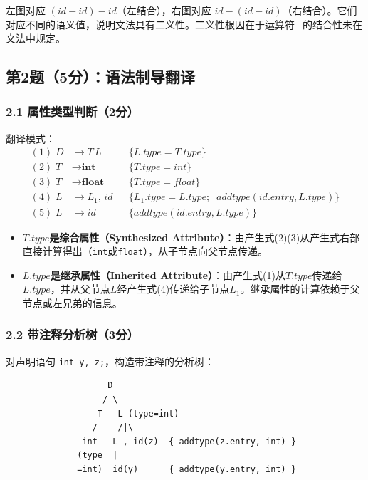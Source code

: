 \documentclass[12pt,a4paper,fontset=fandol]{ctexart}
\begin{document}
左图对应 $(id - id) - id$（左结合），右图对应 $id - (id - id)$（右结合）。它们对应不同的语义值，说明文法具有二义性。二义性根因在于运算符$-$的结合性未在文法中规定。

\subsection{第2题（5分）：语法制导翻译}

\subsubsection*{2.1 属性类型判断（2分）}

翻译模式：
\begin{align*}
(1)\; D &\to T\,L && \{ L.\textit{type} = T.\textit{type} \} \\
(2)\; T &\to \textbf{int} && \{ T.\textit{type} = \textit{int} \} \\
(3)\; T &\to \textbf{float} && \{ T.\textit{type} = \textit{float} \} \\
(4)\; L &\to L_1,\,id && \{ L_1.\textit{type} = L.\textit{type};\;\; \textit{addtype}(id.\textit{entry}, L.\textit{type}) \} \\
(5)\; L &\to id && \{ \textit{addtype}(id.\textit{entry}, L.\textit{type}) \}
\end{align*}

\begin{itemize}
    \item \textbf{$T.\textit{type}$是综合属性（Synthesized Attribute）}：由产生式(2)(3)从产生式右部直接计算得出（\texttt{int}或\texttt{float}），从子节点向父节点传递。
    \item \textbf{$L.\textit{type}$是继承属性（Inherited Attribute）}：由产生式(1)从$T.\textit{type}$传递给$L.\textit{type}$，并从父节点$L$经产生式(4)传递给子节点$L_1$。继承属性的计算依赖于父节点或左兄弟的信息。
\end{itemize}

\subsubsection*{2.2 带注释分析树（3分）}

对声明语句 \texttt{int y, z;}，构造带注释的分析树：

\begin{verbatim}
                    D
                   / \
                  T   L (type=int)
                 /    /|\
               int   L , id(z)  { addtype(z.entry, int) }
              (type  |
              =int)  id(y)      { addtype(y.entry, int) }
\end{verbatim}
\end{document}
